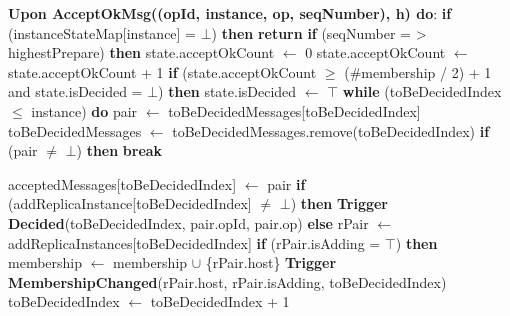 \documentclass[sigconf]{acmart}
\begin{document}
\begin{algorithmic}[1]
\State \textbf{Upon AcceptOkMsg((opId, instance, op, seqNumber), h) do}:
\State \quad \textbf{if} (instanceStateMap[instance] = $\bot$) \textbf{then}
\State \quad \quad \textbf{return}
\State \quad \textbf{if} (seqNumber = > highestPrepare) \textbf{then}
\State \quad \quad state.acceptOkCount $\gets$ 0
\State \quad state.acceptOkCount $\gets$ state.acceptOkCount + 1
\State \quad \textbf{if} (state.acceptOkCount $\ge$ (\#membership / 2) + 1 and state.isDecided = $\bot$) \textbf{then}
\State \quad \quad state.isDecided $\gets$ $\top$
\State \quad \quad \textbf{while} (toBeDecidedIndex $\le$ instance) \textbf{do}
\State \quad \quad \quad pair $\gets$ toBeDecidedMessages[toBeDecidedIndex]
\State \quad \quad \quad toBeDecidedMessages $\gets$ toBeDecidedMessages.remove(toBeDecidedIndex)
\State \quad \quad \quad \textbf{if} (pair $\neq$ $\bot$) \textbf{then}
\State \quad \quad \quad \quad \textbf{break}

\State \quad \quad \quad acceptedMessages[toBeDecidedIndex] $\gets$ pair
\State \quad \quad \quad \textbf{if} (addReplicaInstance[toBeDecidedIndex] $\neq$ $\bot$) \textbf{then}
\State \quad \quad \quad \quad \textbf{Trigger Decided}(toBeDecidedIndex, pair.opId, pair.op)
\State \quad \quad \quad \textbf{else}
\State \quad \quad \quad \quad rPair $\gets$ addReplicaInstances[toBeDecidedIndex]
\State \quad \quad \quad  \textbf{if} (rPair.isAdding = $\top$) \textbf{then}
\State \quad \quad \quad \quad \quad membership $\gets$ membership $\cup$ \{rPair.host\}
\State \quad \quad \quad \textbf{Trigger MembershipChanged}(rPair.host, rPair.isAdding, toBeDecidedIndex)
\State \quad \quad \quad toBeDecidedIndex $\gets$ toBeDecidedIndex + 1 \\ 
\end{algorithmic}
\end{document}
